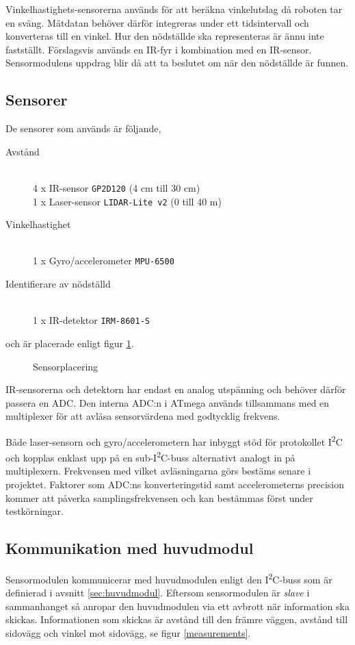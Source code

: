 \documentclass[11pt]{article}
\begin{document}
\begin{flushleft}
Vinkelhastighets-sensorerna används för att beräkna vinkelutslag då roboten tar en sväng. Mätdatan behöver därför integreras under ett tidsintervall och konverteras till en vinkel. Hur den nödställde ska representeras är ännu inte fastställt. Förslagsvis används en IR-fyr i kombination med en IR-sensor. Sensormodulens uppdrag blir då att ta beslutet om när den nödställde är funnen.


\subsection{Sensorer}
De sensorer som används är följande,
\begin{description}
	\item[Avstånd] \hfill \\
	4 x IR-sensor \verb+GP2D120+ (4 cm till 30 cm) \\
	1 x Laser-sensor \verb+LIDAR-Lite v2+ (0 till 40 m) \\
	\item[Vinkelhastighet] \hfill \\
	1 x Gyro/accelerometer \verb+MPU-6500+ 
	\item[Identifierare av nödställd] \hfill \\
	1 x IR-detektor \verb+IRM-8601-S+
\end{description}
och är placerade enligt figur \ref{sensors}. 

\begin{figure}[htbp]
\centering
\noindent\resizebox{.8\textwidth}{!}{
		}
	\caption{Sensorplacering \label{sensors}}
\end{figure}

IR-sensorerna och detektorn har endast en analog utspänning och behöver därför passera en ADC. Den interna ADC:n i ATmega används tillsammans med en multiplexer för att avläsa sensorvärdena med godtycklig frekvens. 

Både laser-sensorn och gyro/accelerometern har inbyggt stöd för protokollet I\textsuperscript{2}C och kopplas enklast upp på en sub-I\textsuperscript{2}C-buss alternativt analogt in på multiplexern. Frekvensen med vilket avläsningarna görs bestäms senare i projektet. Faktorer som ADC:ns konverteringstid samt accelerometerns precision kommer att påverka samplingsfrekvensen och kan bestämmas först under testkörningar. 

\subsection{Kommunikation med huvudmodul}
Sensormodulen kommunicerar med huvudmodulen enligt den I\textsuperscript{2}C-buss som är definierad i avsnitt \ref{sec:huvudmodul}. Eftersom sensormodulen är \emph{slave} i sammanhanget så anropar den huvudmodulen via ett avbrott när information ska skickas. Informationen som skickas är avstånd till den främre väggen, avstånd till sidovägg och vinkel mot sidovägg, se figur \ref{measurements}. 


\end{flushleft}
\end{document}

